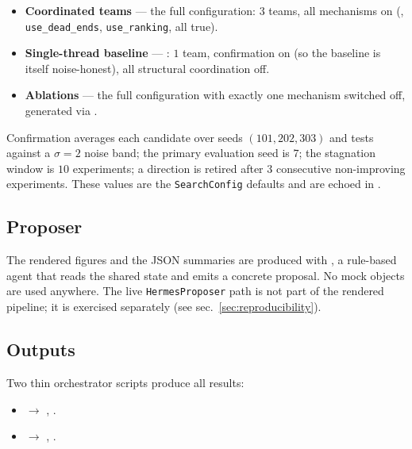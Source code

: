 \documentclass[
]{article}
\providecommand{\tightlist}{%
  \setlength{\itemsep}{0pt}\setlength{\parskip}{0pt}}
\begin{document}
\begin{itemize}
\tightlist
\item
  \textbf{Coordinated teams} --- the full configuration: \(3\) teams,
  all mechanisms on (,
  \texttt{use\_dead\_ends}, \texttt{use\_ranking},
   all true).
\item
  \textbf{Single-thread baseline} ---
  : \(1\) team,
  confirmation on (so the baseline is itself noise-honest), all
  structural coordination off.
\item
  \textbf{Ablations} --- the full configuration with exactly one
  mechanism switched off, generated via .
\end{itemize}

Confirmation averages each candidate over seeds \((101, 202, 303)\) and
tests against a \(\sigma = 2\) noise band; the primary evaluation seed
is \(7\); the stagnation window is \(10\) experiments; a direction is
retired after \(3\) consecutive non-improving experiments. These values
are the \texttt{SearchConfig} defaults and are echoed in
.

\subsection{Proposer}\label{proposer}

The rendered figures and the JSON summaries are produced with
, a rule-based agent that reads the shared
state and emits a concrete proposal. No mock objects are used anywhere.
The live \texttt{HermesProposer} path is not part of the rendered
pipeline; it is exercised separately (see
sec.~\ref{sec:reproducibility}).

\subsection{Outputs}\label{outputs}

Two thin orchestrator scripts produce all results:

\begin{itemize}
\tightlist
\item
   \texorpdfstring{\ensuremath{\to}}{->}
  ,
  .
\item
   \texorpdfstring{\ensuremath{\to}}{->} ,
  .
\end{itemize}
\end{document}
